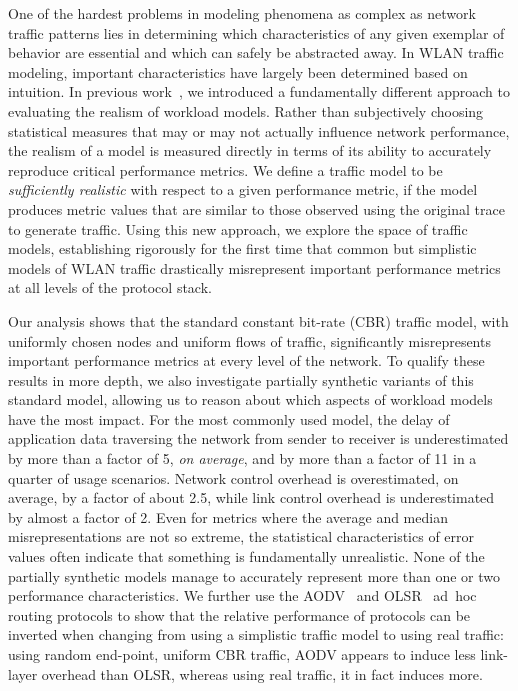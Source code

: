 \documentclass[conference]{IEEEtran}
\newcommand{\caps}[1]{{\small{#1}}}
\begin{document}
One of the hardest problems in modeling phenomena as complex as network traffic patterns lies in determining which characteristics of any given exemplar of behavior are essential and which can safely be abstracted away. In \caps{WLAN} traffic modeling, important characteristics have largely been determined based on intuition. In previous work~\cite{Karpinski07:realism}, we introduced a fundamentally different approach to evaluating the realism of workload models. Rather than subjectively choosing statistical measures that may or may not actually influence network performance, the realism of a model is measured directly in terms of its ability to accurately reproduce critical performance metrics. We define a traffic model to be \textit{sufficiently realistic} with respect to a given performance metric, if the model produces metric values that are similar to those observed using the original trace to generate traffic. Using this new approach, we explore the space of traffic models, establishing rigorously for the first time that common but simplistic models of \caps{WLAN} traffic drastically misrepresent important performance metrics at all levels of the protocol stack.



Our analysis shows that the standard constant bit-rate (\caps{CBR}) traffic model, with uniformly chosen nodes and uniform flows of traffic, significantly misrepresents important performance metrics at every level of the network. To qualify these results in more depth, we also investigate partially synthetic variants of this standard model, allowing us to reason about which aspects of workload models have the most impact. For the most commonly used model, the delay of application data traversing the network from sender to receiver is underestimated by more than a factor of 5, \textit{on average}, and by more than a factor of 11 in a quarter of usage scenarios. Network control overhead is overestimated, on average, by a factor of about 2.5, while link control overhead is underestimated by almost a factor of 2. Even for metrics where the average and median misrepresentations are not so extreme, the statistical characteristics of error values often indicate that something is fundamentally unrealistic. None of the partially synthetic models manage to accurately represent more than one or two performance characteristics. We further use the \caps{AODV}~\cite{rfc:aodv} and \caps{OLSR}~\cite{rfc:olsr} ad~hoc routing protocols to show that the relative performance of protocols can be inverted when changing from using a simplistic traffic model to using real traffic: using random end-point, uniform \caps{CBR} traffic, \caps{AODV} appears to induce less link-layer overhead than \caps{OLSR}, whereas using real traffic, it in fact induces more.
\end{document}
